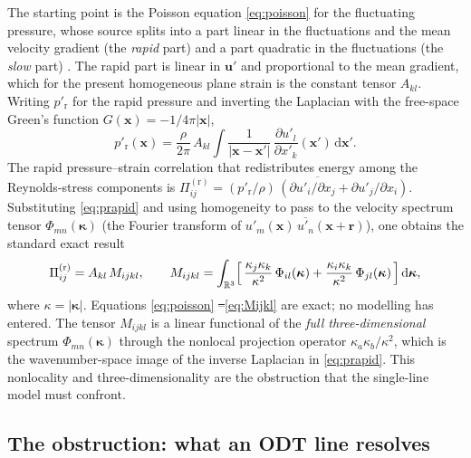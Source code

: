 \documentclass[lineno]{JFM-FLM_Au}
\providecommand{\DIFadd}[1]{{\protect\color{blue}\uwave{#1}}} %
\providecommand{\DIFdel}[1]{{\protect\color{red}\sout{#1}}} %
\providecommand{\DIFaddbegin}{} %
\providecommand{\DIFaddend}{} %
\providecommand{\DIFdelbegin}{} %
\providecommand{\DIFdelend}{} %
\begin{document}
The starting point is the Poisson equation \eqref{eq:poisson} for the
fluctuating pressure, whose source splits into a part linear in the
fluctuations and the mean velocity gradient (the \emph{rapid} part) and a
part quadratic in the fluctuations (the \emph{slow} part)
\citep{Pope2000}. The rapid part is linear in $\boldsymbol{u}'$ and
proportional to the mean gradient, which for the present homogeneous
plane strain is the constant tensor $A_{kl}$. Writing
$p'_{\mathrm r}$ for the rapid pressure and inverting the Laplacian with the
free-space Green's function $G(\boldsymbol{x})=-1/4\pi|\boldsymbol{x}|$,
\begin{equation}
  p'_{\mathrm r}(\boldsymbol{x})
  = \frac{\rho}{2\pi}\,A_{kl}\!\int
    \frac{1}{|\boldsymbol{x}-\boldsymbol{x}'|}\,
    \frac{\partial u'_l}{\partial x'_k}(\boldsymbol{x}')\,
    \mathrm{d}\boldsymbol{x}' .
  \label{eq:prapid}
\end{equation}
The rapid pressure--strain correlation that redistributes energy among the
Reynolds-stress components is
$\Pi^{(\mathrm r)}_{ij}
   = \overline{(p'_{\mathrm r}/\rho)\,(\partial u'_i/\partial x_j
     + \partial u'_j/\partial x_i)}$.
Substituting \eqref{eq:prapid} and using homogeneity to pass to the
velocity spectrum tensor
$\Phi_{mn}(\boldsymbol{\kappa})$
(the Fourier transform of $\overline{u'_m(\boldsymbol{x})\,
u'_n(\boldsymbol{x}+\boldsymbol{r})}$),
one obtains the standard exact result
\citep{BatchelorProudman1954,Crow1968,HuntCarruthers1990}
\begin{equation}
  \Pi^{(\mathrm r)}_{ij}
  = A_{kl}\,M_{ijkl},
  \qquad
  M_{ijkl}
  = \int_{\mathbb{R}^3}
    \Bigl[\,
      \frac{\kappa_j\kappa_k}{\kappa^2}\,\Phi_{il}(\boldsymbol{\kappa})
      + \frac{\kappa_i\kappa_k}{\kappa^2}\,\Phi_{jl}(\boldsymbol{\kappa})
    \,\Bigr]\,\mathrm{d}\boldsymbol{\kappa},
  \label{eq:Mijkl}
\end{equation}
where $\kappa=|\boldsymbol{\kappa}|$. Equations
\eqref{eq:poisson} \DIFdelbegin \DIFdel{--}\DIFdelend \DIFaddbegin \DIFadd{and }\DIFaddend \eqref{eq:Mijkl} are exact; no modelling has entered. The
tensor $M_{ijkl}$ is a linear functional of the \emph{full three-dimensional}
spectrum $\Phi_{mn}(\boldsymbol{\kappa})$ through the nonlocal projection
operator $\kappa_a\kappa_b/\kappa^2$, which is the wavenumber-space image of
the inverse Laplacian in \eqref{eq:prapid}. This nonlocality and
three-dimensionality are the obstruction that the single-line model must
confront.

\subsection{The obstruction: what an ODT line resolves}\label{sec:obstruction}
\end{document}
